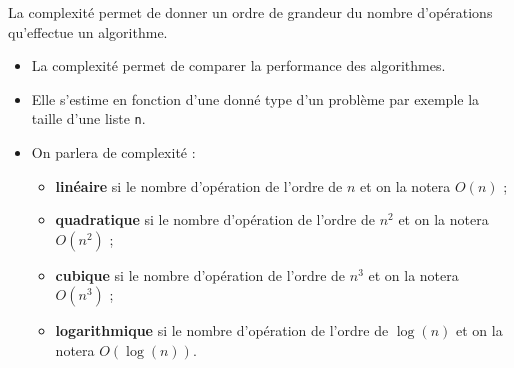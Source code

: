 \begin{definition2}
La complexité permet de donner un ordre de grandeur du nombre d'opérations qu'effectue un algorithme.
\begin{itemize}
\item La complexité permet de comparer la performance des algorithmes.
\item Elle s'estime en fonction d'une donné type d'un problème par exemple la taille d'une liste \texttt{n}.
\item On parlera de complexité : 
\begin{itemize}
\item \textbf{linéaire} si le nombre d'opération de l'ordre de $n$ et on la notera $O(n)$ ;
\item \textbf{quadratique} si le nombre d'opération de l'ordre de $n^2$ et on la notera $O(n^2)$ ;
\item \textbf{cubique} si le nombre d'opération de l'ordre de $n^3$ et on la notera $O(n^3)$ ;
\item \textbf{logarithmique} si le nombre d'opération de l'ordre de $\log(n)$ et on la notera $O(\log(n))$.
\end{itemize}
\end{itemize}
\end{definition2}

